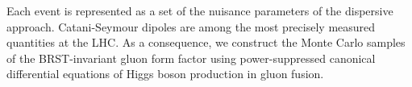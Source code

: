 Each event is represented as a set of the nuisance parameters of the
dispersive approach. Catani-Seymour dipoles are among the most precisely
measured quantities at the LHC. As a consequence, we construct the Monte
Carlo samples of the BRST-invariant gluon form factor using
power-suppressed canonical differential equations of Higgs boson
production in gluon fusion.

